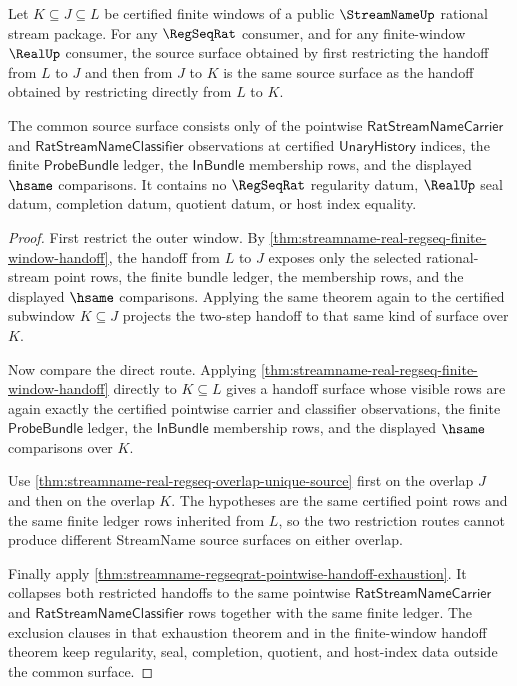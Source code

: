 \begin{theorem}
\label{thm:streamname-regseqrat-nested-window-handoff}
Let $K \subseteq J \subseteq L$ be certified finite windows of a public
$\StreamNameUp$ rational stream package. For any $\RegSeqRat$ consumer, and
for any finite-window $\RealUp$ consumer, the source surface obtained by first
restricting the handoff from $L$ to $J$ and then from $J$ to $K$ is the same
source surface as the handoff obtained by restricting directly from $L$ to
$K$.

The common source surface consists only of the pointwise
$\mathsf{RatStreamNameCarrier}$ and
$\mathsf{RatStreamNameClassifier}$ observations at certified
$\mathsf{UnaryHistory}$ indices, the finite $\mathsf{ProbeBundle}$ ledger,
the $\mathsf{InBundle}$ membership rows, and the displayed $\hsame$
comparisons. It contains no $\RegSeqRat$ regularity datum, $\RealUp$ seal
datum, completion datum, quotient datum, or host index equality.
\end{theorem}
\begin{proof}
First restrict the outer window. By
\autoref{thm:streamname-real-regseq-finite-window-handoff}, the handoff from
$L$ to $J$ exposes only the selected rational-stream point rows, the finite
bundle ledger, the membership rows, and the displayed $\hsame$ comparisons.
Applying the same theorem again to the certified subwindow $K \subseteq J$
projects the two-step handoff to that same kind of surface over $K$.

Now compare the direct route. Applying
\autoref{thm:streamname-real-regseq-finite-window-handoff} directly to
$K \subseteq L$ gives a handoff surface whose visible rows are again exactly
the certified pointwise carrier and classifier observations, the finite
$\mathsf{ProbeBundle}$ ledger, the $\mathsf{InBundle}$ membership rows, and
the displayed $\hsame$ comparisons over $K$.

Use \autoref{thm:streamname-real-regseq-overlap-unique-source} first on the
overlap $J$ and then on the overlap $K$. The hypotheses are the same certified
point rows and the same finite ledger rows inherited from $L$, so the two
restriction routes cannot produce different StreamName source surfaces on
either overlap.

Finally apply
\autoref{thm:streamname-regseqrat-pointwise-handoff-exhaustion}. It collapses
both restricted handoffs to the same pointwise
$\mathsf{RatStreamNameCarrier}$ and
$\mathsf{RatStreamNameClassifier}$ rows together with the same finite ledger.
The exclusion clauses in that exhaustion theorem and in the finite-window
handoff theorem keep regularity, seal, completion, quotient, and host-index
data outside the common surface.
\end{proof}

